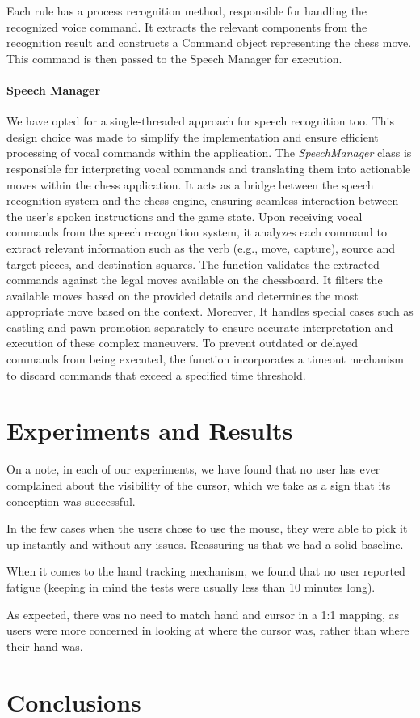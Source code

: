 \documentclass[a4paper, 11pt, twocolumn]{IEEEtran}
\begin{document}
    Each rule has a process recognition method, responsible for handling the recognized voice command. It extracts the relevant components from the recognition result and constructs a Command object representing the chess move. This command is then passed to the Speech Manager for execution.

    \paragraph*{Speech Manager} 
    We have opted for a single-threaded approach for speech recognition too. This design choice was made to simplify the implementation and ensure efficient processing of vocal commands within the application. The \emph{SpeechManager} class is responsible for interpreting vocal commands and translating them into actionable moves within the chess application. It acts as a bridge between the speech recognition system and the chess engine, ensuring seamless interaction between the user's spoken instructions and the game state. Upon receiving vocal commands from the speech recognition system, it analyzes each command to extract relevant information such as the verb (e.g., move, capture), source and target pieces, and destination squares. The function validates the extracted commands against the legal moves available on the chessboard. It filters the available moves based on the provided details and determines the most appropriate move based on the context. Moreover, It handles special cases such as castling and pawn promotion separately to ensure accurate interpretation and execution of these complex maneuvers. To prevent outdated or delayed commands from being executed, the function incorporates a timeout mechanism to discard commands that exceed a specified time threshold.





    
    \section{Experiments and Results}

    On a note, in each of our experiments, we have found that no user has ever complained about the visibility of the cursor, which we take as a sign that its conception was successful.

    In the few cases when the users chose to use the mouse, they were able to pick it up instantly and without any issues. Reassuring us that we had a solid baseline.

    When it comes to the hand tracking mechanism, we found that no user reported fatigue (keeping in mind the tests were usually less than 10 minutes long). 

    As expected, there was no need to match hand and cursor in a 1:1 mapping, as users were more concerned in looking at where the cursor was, rather than where their hand was.

    \section{Conclusions}
\end{document}
